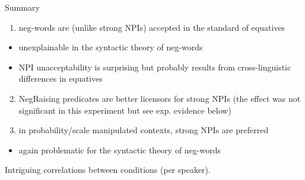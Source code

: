 \documentclass[
  ignorenonframetext,
]{beamer}
\providecommand{\tightlist}{%
  \setlength{\itemsep}{0pt}\setlength{\parskip}{0pt}}
\begin{document}
\begin{frame}
\begin{block}{Summary}
\protect\hypertarget{summary}{}
\begin{enumerate}
\tightlist
\item
  neg-words are (unlike strong NPIs) accepted in the standard of
  equatives
\end{enumerate}

\begin{itemize}
\tightlist
\item
  unexplainable in the syntactic theory of neg-words
\item
  NPI unacceptability is surprising but probably results from
  cross-linguistic differences in equatives
\end{itemize}

\begin{enumerate}
\setcounter{enumi}{1}
\item
  NegRaising predicates are better licensors for strong NPIs (the effect
  was not significant in this experiment but see exp. evidence below)
\item
  in probability/scale manipulated contexts, strong NPIs are preferred
\end{enumerate}

\begin{itemize}
\tightlist
\item
  again problematic for the syntactic theory of neg-words
\end{itemize}

Intriguing correlations between conditions (per speaker).
\end{block}
\end{frame}
\end{document}
